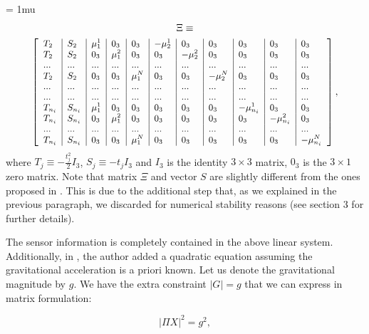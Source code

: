 \documentclass[letterpaper, 10pt, conference, final]{ieeeconf}  %
\begin{document}
{
\arraycolsep=3pt %
\medmuskip = 1mu %
\begin{multline*}
  \Xi \equiv \\
      {
        \footnotesize
        \left[
          \begin{array}{l|l|l|l|l|l|l|l|l|l|l}
            T_2 & S_2 & \mu_1^1 & 0_3 & 0_3 & -\mu_2^1 & 0_3 & 0_3 & 0_3 & 0_3 & 0_3 \\
            T_2 & S_2 & 0_3 & \mu_1^2 & 0_3 & 0_3 & -\mu_2^2 & 0_3 & 0_3 & 0_3 & 0_3 \\
            ... & ... & ... & ... & ... & ... & ... & ... & ... & ... & ... \\
            T_2 & S_2 & 0_3 & 0_3 & \mu_1^N & 0_3 & 0_3 & -\mu_2^N & 0_3 & 0_3 & 0_3 \\
            ... & ... & ... & ... & ... & ... & ... & ... & ... & ... & ... \\
            ... & ... & ... & ... & ... & ... & ... & ... & ... & ... & ... \\
            T_{n_i} & S_{n_i} & \mu_1^1 & 0_3 & 0_3 & 0_3 & 0_3 & 0_3 & -\mu_{n_i}^1 & 0_3 & 0_3 \\
            T_{n_i} & S_{n_i} & 0_3 & \mu_1^2 & 0_3 & 0_3 & 0_3 & 0_3 & 0_3 & -\mu_{n_i}^2 & 0_3 \\
            ... & ... & ... & ... & ... & ... & ... & ... & ... & ... & ... \\
            T_{n_i} & S_{n_i} & 0_3 & 0_3 & \mu_1^N & 0_3 & 0_3 & 0_3 & 0_3 & 0_3 & -\mu_{n_i}^N
          \end{array}
          \right],
      }
\end{multline*}
}
\noindent where $T_j \equiv - \frac{t^2_j}{2} I_3$, $S_j \equiv -t_j I_3$ and $I_3$ is the identity $3\times 3$ matrix, $0_3$ is the $3\times 1$ zero matrix.
Note that matrix $\Xi$ and vector $S$ are slightly different from the ones proposed in \cite{Martinelli2014}.
This is due to the additional step that, as we explained in the previous paragraph, we discarded for numerical stability reasons (see \cite{Martinelli2014} section 3 for further details).

The sensor information is completely contained in the above linear system. Additionally, in \cite{Martinelli2014}, the author added a quadratic equation assuming the gravitational acceleration is a priori known.
Let us denote the gravitational magnitude by $g$.
We have the extra constraint $|G| = g$ that we can express in matrix formulation:

\begin{equation}
\label{eq:mat2}
| \Pi X | ^2 = g^2,
\end{equation}
\end{document}
